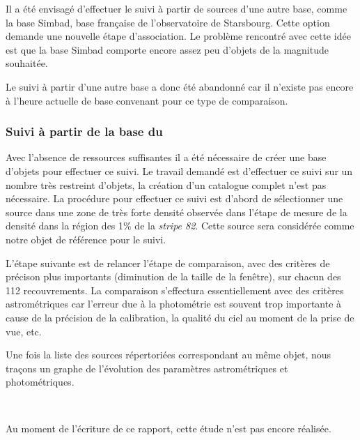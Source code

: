Il a été envisagé d'effectuer le suivi à partir de sources d'une autre base, comme la base Simbad, base française de l'observatoire de Starsbourg. Cette option demande une nouvelle étape d'association. Le problème rencontré avec cette idée est que la base Simbad comporte encore assez peu d'objets de la magnitude souhaitée.

Le suivi à partir d'une autre base a donc été abandonné car il n'existe pas encore à l'heure actuelle de base convenant pour ce type de comparaison.

		\subsubsection{Suivi à partir de la base du \stack{}}

Avec l'absence de ressources suffisantes il a été nécessaire de créer une base d'objets pour effectuer ce suivi. Le travail demandé est d'effectuer ce suivi sur un nombre très restreint d'objets, la création d'un catalogue complet n'est pas nécessaire. La procédure pour effectuer ce suivi est d'abord de sélectionner une source dans une zone de très forte densité observée dans l'étape de mesure de la densité dans la région des 1\% de la \emph{stripe 82}. Cette source sera considérée comme notre objet de référence pour le suivi.

L'étape suivante est de relancer l'étape de comparaison, avec des critères de précison plus importants (diminution de la taille de la fenêtre), sur chacun des 112 recouvrements. La comparaison s'effectura essentiellement avec des critères astrométriques car l'erreur due à la photométrie est souvent trop importante à cause de la précision de la calibration, la qualité du ciel au moment de la prise de vue, etc.

Une fois la liste des sources répertoriées correspondant au même objet, nous traçons un graphe de l'évolution des paramètres astrométriques et photométriques.

\

Au moment de l'écriture de ce rapport, cette étude n'est pas encore réalisée.
